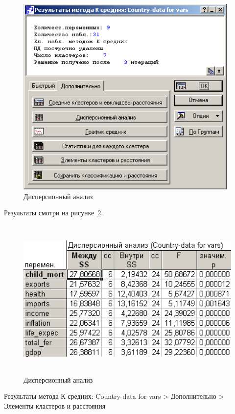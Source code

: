 \begin{figure}[!h]
  \centering

  \includegraphics[height=10cm]
  {inc/cars_my/var5__2_3.PNG}

  \caption{Дисперсионный анализ}
  \label{fig:var5__2_3}
\end{figure}

\newpage

Результаты смотри на рисунке~\ref{fig:var5__2_4}.

\begin{figure}[!h]
  \centering

  \includegraphics[height=8cm]
  {inc/cars_my/var5__2_4.PNG}

  \caption{Дисперсионный анализ}
  \label{fig:var5__2_4}
\end{figure}

Результаты метода К средних: Country-data for vars > Дополнительно > Элементы кластеров и расстояния

